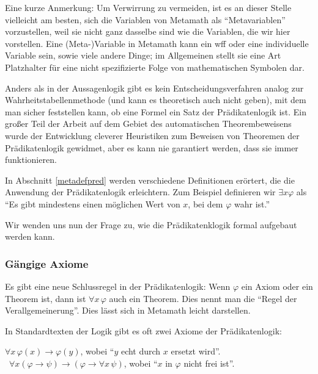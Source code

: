 Eine kurze Anmerkung:
Um Verwirrung zu vermeiden, ist es an dieser Stelle vielleicht am besten, sich die Variablen von Metamath als "`Metavariablen"' vorzustellen, weil sie nicht ganz dasselbe sind wie die Variablen, die wir hier vorstellen.  Eine (Meta-)Variable in Metamath kann ein wff oder eine individuelle Variable sein, sowie viele andere Dinge; im Allgemeinen stellt sie eine Art Platzhalter für eine nicht spezifizierte Folge von mathematischen Symbolen dar.

Anders als in der Aussagenlogik gibt es kein Entscheidungsverfahren analog zur Wahrheitstabellenmethode (und kann es theoretisch auch nicht geben), mit dem man sicher feststellen kann, ob eine Formel ein Satz der Prädikatenlogik ist.  Ein großer Teil der Arbeit auf dem Gebiet des automatischen Theorembeweisens wurde der Entwicklung cleverer Heuristiken zum Beweisen von Theoremen der Prädikatenlogik gewidmet, aber es kann nie garantiert werden, dass sie immer funktionieren.

In Abschnitt \ref{metadefpred} werden verschiedene Definitionen erörtert, die die Anwendung der Prädikatenlogik erleichtern. Zum Beispiel definieren wir $\exists x \varphi$ als "`Es gibt mindestens einen möglichen Wert von $x$, bei dem $\varphi$ wahr ist."'

Wir wenden uns nun der Frage zu, wie die Prädikatenklogik formal aufgebaut werden kann.

\subsubsection{Gängige Axiome}

Es gibt eine neue Schlussregel in der Prädikatenlogik: Wenn $\varphi$ ein Axiom oder ein Theorem ist, dann ist $\forall x \,\varphi$ auch ein Theorem.  Dies nennt man die "`Regel der Verallgemeinerung"'. Dies lässt sich in Metamath leicht darstellen.

In Standardtexten der Logik gibt es oft zwei Axiome der Prädikatenlogik:
\begin{center}
    $\forall x \,\varphi ( x ) \rightarrow \varphi ( y )$, wobei "`$y$ echt durch $x$ ersetzt wird"'.\\\ $\forall x ( \varphi \rightarrow \psi )\rightarrow ( \varphi \rightarrow \forall x\, \psi )$, wobei "`$x$ in $\varphi$ nicht frei ist"'.
\end{center}

